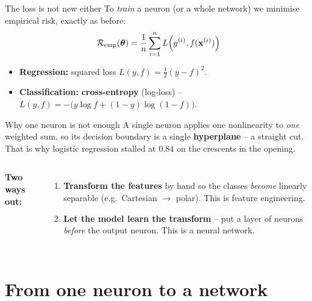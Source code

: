 \documentclass[aspectratio=169]{beamer}
\begin{document}
\begin{frame}{The loss is not new either}
  To \emph{train} a neuron (or a whole network) we minimise empirical risk, exactly as
  before:
  \[
    \mathcal{R}_{\text{emp}}(\bm{\theta}) = \frac{1}{n}\sum_{i=1}^{n} L\!\left(y^{(i)}, f(\mathbf{x}^{(i)})\right)
  \]
  \begin{itemize}\small
    \item \textbf{Regression:} squared loss $L(y,f)=\tfrac12 (y-f)^2$.
    \item \textbf{Classification:} \textbf{cross-entropy} (log-loss) --
      $L(y,f) = -\big(y\log f + (1-y)\log(1-f)\big)$.
  \end{itemize}
  \vfill
\end{frame}

\begin{frame}{Why one neuron is not enough}
  A single neuron applies one nonlinearity to \emph{one} weighted sum, so its decision
  boundary is a single \textbf{hyperplane} -- a straight cut. That is why logistic
  regression stalled at $0.84$ on the crescents in the opening.
  \vfill
  \begin{columns}[T]
    \textbf{Two ways out:}
    \begin{enumerate}\small
      \item \textbf{Transform the features} by hand so the classes \emph{become} linearly
        separable (e.g.\ Cartesian $\to$ polar). This is feature engineering.
      \item \textbf{Let the model learn the transform} -- put a layer of neurons
        \emph{before} the output neuron. This is a neural network.
    \end{enumerate}
  \end{columns}
\end{frame}

\section{From one neuron to a network}
\end{document}
